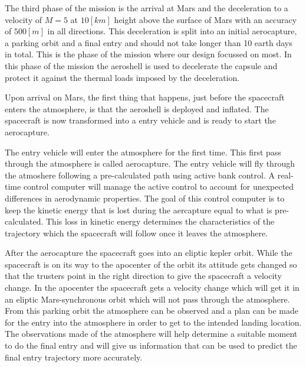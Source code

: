 The third phase of the mission is the arrival at Mars and the deceleration to a velocity of $M=5$ at $10 \left[km\right]$ height above the surface of Mars with an accuracy of $500 \left[m\right]$ in all directions. This deceleration is split into an initial aerocapture, a parking orbit and a final entry and should not take longer than 10 earth days in total. This is the phase of the mission where our design focussed on most. In this phase of the mission the aeroshell is used to decelerate the capsule and protect it against the thermal loads imposed by the deceleration.

Upon arrival on Mars, the first thing that happens, just before the spacecraft enters the atmosphere, is that the aeroshell is deployed and inflated. %
The spacecraft is now transformed into a entry vehicle and is ready to start the aerocapture.

The entry vehicle will enter the atmosphere for the first time. This first pass through the atmosphere is called aerocapture. The entry vehicle will fly through the atmoshere following a pre-calculated path using active bank control. A real-time control computer will manage the active control to account for unexpected differences in aerodynamic properties. The goal of this control computer is to keep the kinetic energy that is lost during the aercapture equal to what is pre-calculated. This loss in kinetic energy determines the characteristics of the trajectory which the spacecraft will follow once it leaves the atmosphere. %

After the aerocapture the spacecraft goes into an eliptic kepler orbit. While the spacecraft is on its way to the apocenter of the orbit its attitude gets changed so that the trusters point in the right direction to give the spacecraft a velocity change. In the apocenter the spacecraft gets a velocity change which will get it in an eliptic Mars-synchronous orbit which will not pass through the atmosphere. From this parking orbit the atmosphere can be observed and a plan can be made for the entry into the atmosphere in order to get to the intended landing location. The observations made of the atmosphere will help determine a suitable moment to do the final entry and will give us information that can be used to predict the final entry trajectory more accurately.

